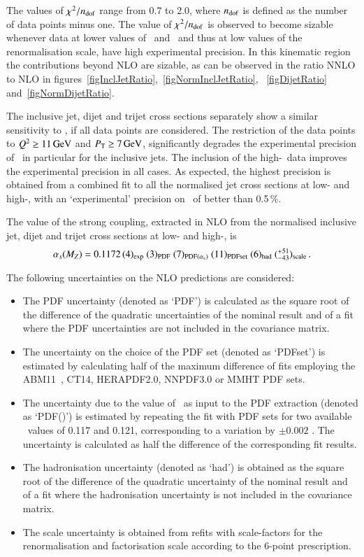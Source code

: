 \documentclass[12pt]{article}
\begin{document}
The values of $\chisq/\ndf$ range from 0.7 to 2.0, where $\ndf$ is defined as the number of data points minus one.
The value of $\chisq/\ndf$ is observed to become sizable whenever data at lower values of \Qsq\ and \pt\ and thus
at low values of the renormalisation scale, have high experimental precision.
In this kinematic region the contributions beyond NLO are sizable, as can be observed in the 
ratio NNLO to NLO in figures~\ref{figInclJetRatio},~\ref{figNormInclJetRatio}, ~\ref{figDijetRatio} and~\ref{figNormDijetRatio}.

The inclusive jet, dijet and trijet cross sections separately show a similar sensitivity to \asmz, if all data points are considered.
The restriction of the data points to $\Qsq\geq 11\,\GeV$ and $\pt\geq 7\,\GeV$, significantly degrades the experimental precision of \asmz\
in particular for the inclusive jets.
The inclusion of the high-\Qsq\ data improves the experimental precision in all cases.
As expected, the highest precision is obtained from a combined fit to all the normalised 
jet cross sections at low- and high-\Qsq, with an `experimental'
 precision on \asmz\ of better than 0.5\,\%.

The value of the strong coupling,  extracted in NLO from the normalised inclusive jet, dijet and trijet cross sections at low- and high-\Qsq, is
\begin{equation}
  \asmz = 0.1172\,(4)_{\rm exp}~ (3)_{\rm PDF}~ (7)_{\rm PDF(\as)} ~(11)_{\rm PDFset} ~ (6)_{\rm had} ~ (^{+51}_{-43})_{\rm scale}\,.
 \label{eq:alphasresult}
\end{equation}


The following uncertainties on the NLO predictions are considered:
\begin{itemize}
  \item The PDF uncertainty  (denoted as `PDF') is calculated as the square root of the difference of the quadratic uncertainties of the nominal result and of a fit where the PDF uncertainties are not included in the covariance matrix.
  \item The uncertainty on the choice of the PDF set (denoted as `PDFset') is estimated by calculating half of the maximum difference of fits employing the ABM11~\cite{ABM11}, CT14, HERAPDF2.0, NNPDF3.0 or MMHT PDF sets.
  \item The uncertainty due to the value of \asmz\ as input to the PDF extraction (denoted as `PDF(\as)') is estimated
    by repeating the fit with PDF sets for two available \asmz\ values of 0.117 and 0.121,
corresponding to a variation by $\pm0.002$ \cite{Lai:2010nw,Botje:2011sn}.
    The uncertainty is calculated as half the difference of the corresponding fit results.
  \item The hadronisation uncertainty (denoted as `had') is obtained as the square root of the difference of the quadratic uncertainty of the nominal result and of a fit where the hadronisation uncertainty is not included in the covariance matrix.
  \item The scale uncertainty is obtained from refits with scale-factors for the renormalisation and factorisation scale according to the 6-point prescription. 
\end{itemize}
\end{document}
